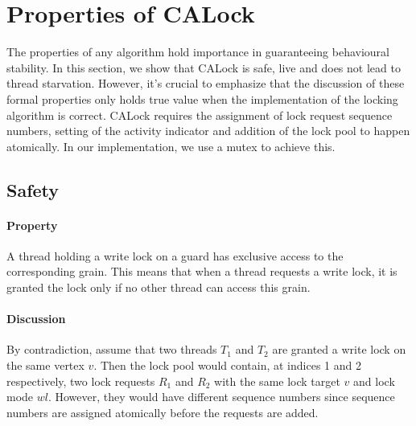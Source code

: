 \section{Properties of CALock} \label{formalProperties}
The properties of any algorithm hold importance in guaranteeing behavioural stability. In this section, we show that CALock is safe, live and does not lead to thread starvation. 
However, it's crucial to emphasize that the discussion of these formal properties only holds true value when the implementation of the locking algorithm is correct. 
CALock requires the assignment of lock request sequence numbers, setting of the activity indicator and addition of the lock pool to happen atomically. 
In our implementation, we use a mutex to achieve this. 
%

\subsection[Safety]{Safety}


\paragraph{Property} A thread holding a write lock on a guard has exclusive access to the corresponding grain. 
This means that when a thread requests a write lock, it is granted the lock only if no other thread can access this grain.

\paragraph{Discussion} By contradiction, assume that two threads $T_1$ and $T_2$ are granted a write lock on the same vertex $v$. 
Then the lock pool would contain, at indices 1 and 2 respectively, two lock requests $R_1$ and $R_2$ with the same lock target $v$ and lock mode $wl$. However, they would have different sequence numbers since sequence numbers are assigned atomically before the requests are added.

